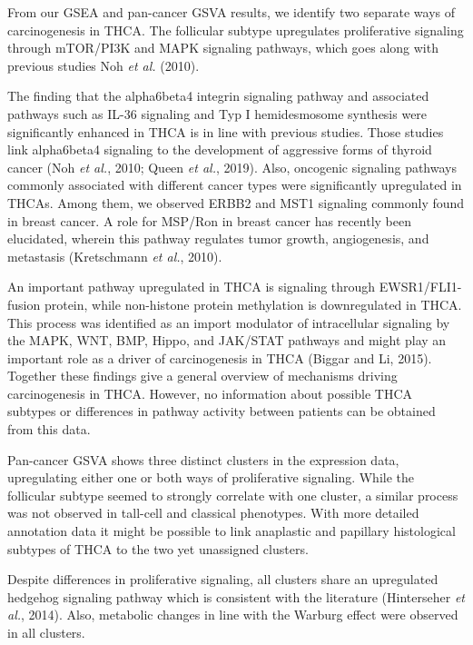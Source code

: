 \documentclass[
  11pt,
  parskip,
  oneside]{scrreprt}
\begin{document}
From our GSEA and pan-cancer GSVA results, we identify two separate ways
of carcinogenesis in THCA. The follicular subtype upregulates
proliferative signaling through mTOR/PI3K and MAPK signaling pathways,
which goes along with previous studies Noh \emph{et al.} (2010).

The finding that the alpha6beta4 integrin signaling pathway and
associated pathways such as IL-36 signaling and Typ I hemidesmosome
synthesis were significantly enhanced in THCA is in line with previous
studies. Those studies link alpha6beta4 signaling to the development of
aggressive forms of thyroid cancer (Noh \emph{et al.}, 2010; Queen
\emph{et al.}, 2019). Also, oncogenic signaling pathways commonly
associated with different cancer types were significantly upregulated in
THCAs. Among them, we observed ERBB2 and MST1 signaling commonly found
in breast cancer. A role for MSP/Ron in breast cancer has recently been
elucidated, wherein this pathway regulates tumor growth, angiogenesis,
and metastasis (Kretschmann \emph{et al.}, 2010).

An important pathway upregulated in THCA is signaling through
EWSR1/FLI1-fusion protein, while non-histone protein methylation is
downregulated in THCA. This process was identified as an import
modulator of intracellular signaling by the MAPK, WNT, BMP, Hippo, and
JAK/STAT pathways and might play an important role as a driver of
carcinogenesis in THCA (Biggar and Li, 2015). Together these findings
give a general overview of mechanisms driving carcinogenesis in THCA.
However, no information about possible THCA subtypes or differences in
pathway activity between patients can be obtained from this data.

Pan-cancer GSVA shows three distinct clusters in the expression data,
upregulating either one or both ways of proliferative signaling. While
the follicular subtype seemed to strongly correlate with one cluster, a
similar process was not observed in tall-cell and classical phenotypes.
With more detailed annotation data it might be possible to link
anaplastic and papillary histological subtypes of THCA to the two yet
unassigned clusters.

Despite differences in proliferative signaling, all clusters share an
upregulated hedgehog signaling pathway which is consistent with the
literature (Hinterseher \emph{et al.}, 2014). Also, metabolic changes in
line with the Warburg effect were observed in all clusters.
\end{document}
